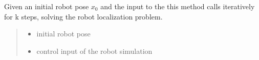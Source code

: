 \documentclass[letterpaper,10pt,english]{sphinxmanual}
\begin{document}
\begin{fulllineitems}
\begin{fulllineitems}
\end{fulllineitems}


\begin{fulllineitems}
\label{\detokenize{GridLocalization:GL.GL.uk2cell}}
\pysigstartsignatures
{}
\pysigstopsignatures\begin{quote}\begin{description}
\sphinxAtStartPar
{} \textendash{} 

\sphinxAtStartPar


\end{description}\end{quote}

\end{fulllineitems}


\begin{fulllineitems}
\label{\detokenize{GridLocalization:GL.GL.LocalizationLoop}}
\pysigstartsignatures
{}
\pysigstopsignatures
\sphinxAtStartPar
Given an initial robot pose \(x_0\) and the input to the  this method calls iteratively  for k steps, solving the robot localization problem.
\begin{quote}\begin{description}
\begin{itemize}
\item {} 
\sphinxAtStartPar
{} \textendash{} initial robot pose

\item {} 
\sphinxAtStartPar
{} \textendash{} control input of the robot simulation

\end{itemize}

\end{description}\end{quote}


\end{fulllineitems}
\end{fulllineitems}
\end{document}

